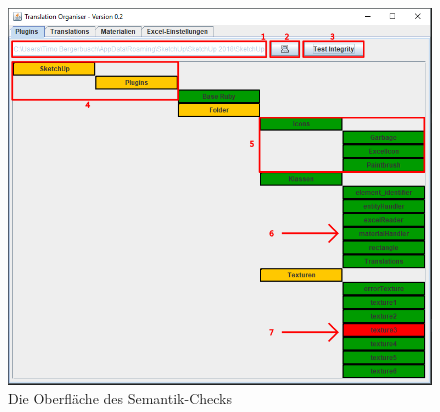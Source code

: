 \documentclass{book}
\begin{document}
			\begin{figure}
				\centering
				\includegraphics[scale=0.48]{pics/assisttool/semantik-check.png}
				\caption{Die Oberfläche des Semantik-Checks}
				\label{fig:semantik check}
			\end{figure}
		
\end{document}
